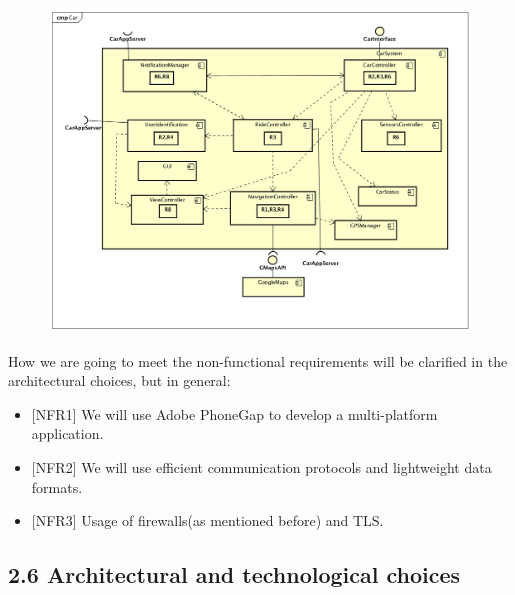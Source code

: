 \documentclass[]{article}
\providecommand{\tightlist}{%
  \setlength{\itemsep}{0pt}\setlength{\parskip}{0pt}}
\begin{document}
\begin{figure}[htbp]
\centering
\includegraphics[width=1.00000\textwidth,height=1.00000\textwidth]{./comp_diagrams/car_reqt.png}
\caption{}\label{id}
\end{figure}

How we are going to meet the non-functional requirements will be
clarified in the architectural choices, but in general:

\begin{itemize}
\tightlist
\item
  {[}NFR1{]} We will use Adobe PhoneGap to develop a multi-platform
  application.
\item
  {[}NFR2{]} We will use efficient communication protocols and
  lightweight data formats.
\item
  {[}NFR3{]} Usage of firewalls(as mentioned before) and TLS.
\end{itemize}

\subsection{2.6 Architectural and technological
choices}\label{architectural-and-technological-choices}
\end{document}
